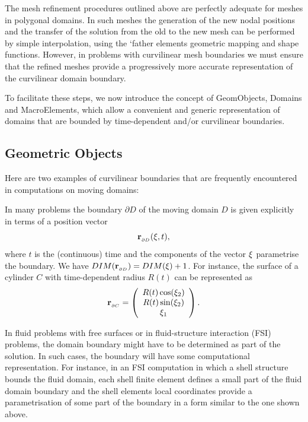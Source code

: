 The mesh refinement procedures outlined above are perfectly adequate for meshes in polygonal domains. In such meshes the generation of the new nodal positions and the transfer of the solution from the old to the new mesh can be performed by simple interpolation, using the `father\textquotesingle{} element\textquotesingle{}s geometric mapping and shape functions. However, in problems with curvilinear mesh boundaries we must ensure that the refined meshes provide a progressively more accurate representation of the curvilinear domain boundary.

To facilitate these steps, we now introduce the concept of {\ttfamily Geom\+Objects}, {\ttfamily Domains} and {\ttfamily Macro\+Elements}, which allow a convenient and generic representation of domains that are bounded by time-\/dependent and/or curvilinear boundaries.\hypertarget{index_GeomObjects}{}\subsection{Geometric Objects}\label{index_GeomObjects}
Here are two examples of curvilinear boundaries that are frequently encountered in computations on moving domains\+:
\begin{DoxyItemize}
\item In many problems the boundary $\partial D$ of the moving domain $D$ is given explicitly in terms of a position vector \[ {\bf r}_{_{\partial D}}(\boldmath{\xi},t), \] where $ t $ is the (continuous) time and the components of the vector $ \boldmath{\xi} $ parametrise the boundary. We have $DIM({\bf r}_{_{\partial D}}) = DIM(\boldmath{\xi}) + 1$. For instance, the surface of a cylinder $C$ with time-\/dependent radius $R(t)$ can be represented as \[ {\bf r}_{_{\partial C}} = \left( \begin{array}{c} R(t) \cos(\xi_2) \\ R(t) \sin(\xi_2) \\ \xi_1 \\ \end{array} \right). \]
\item In fluid problems with free surfaces or in fluid-\/structure interaction (F\+SI) problems, the domain boundary might have to be determined as part of the solution. In such cases, the boundary will have some computational representation. For instance, in an F\+SI computation in which a shell structure bounds the fluid domain, each shell finite element defines a small part of the fluid domain boundary and the shell element\textquotesingle{}s local coordinates provide a parametrisation of some part of the boundary in a form similar to the one shown above.
\end{DoxyItemize}

